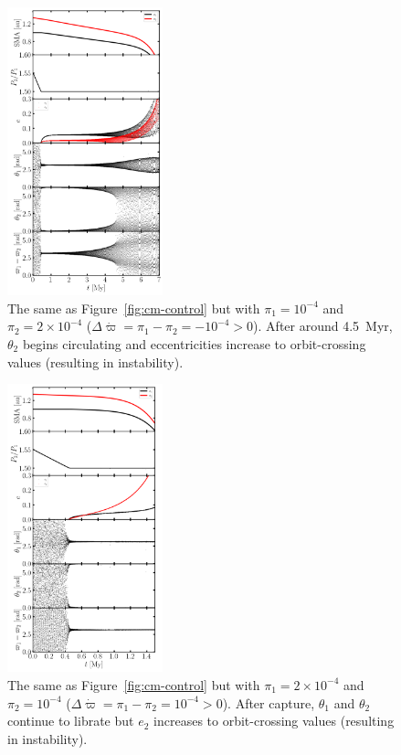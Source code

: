 \documentclass[usenatbib,twocolumn]{mnras}
\begin{document}
\begin{figure}
    \includegraphics[width=0.4\textwidth]{cm_1e-4_2e-4.png}
    \caption{The same as Figure~\ref{fig:cm-control} but with $\pi_1=10^{-4}$ and $\pi_2=2\times10^{-4}$ ($\Delta\dot\varpi=\pi_1-\pi_2=-10^{-4}>0$). After around 4.5~Myr, $\theta_2$ begins circulating and eccentricities increase to orbit-crossing values (resulting in instability).}
    \label{fig:cm-neg-dDpom}
\end{figure}

\begin{figure}
    \includegraphics[width=0.4\textwidth]{cm_2e-4_1e-4.png}
    \caption{The same as Figure~\ref{fig:cm-control} but with $\pi_1=2\times10^{-4}$ and $\pi_2=10^{-4}$ ($\Delta\dot\varpi=\pi_1-\pi_2=10^{-4}>0$). After capture, $\theta_1$ and $\theta_2$ continue to librate but $e_2$ increases to orbit-crossing values (resulting in instability).
    }
    \label{fig:cm-pos-dDpom}
\end{figure}
\end{document}
